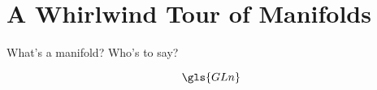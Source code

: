 \documentclass[../main.tex]{subfiles}
\begin{document}
\chapter{A Whirlwind Tour of Manifolds}
\label{ch:manifolds}

What's a manifold? Who's to say?

\[ \gls{GLn} \]
\end{document}
